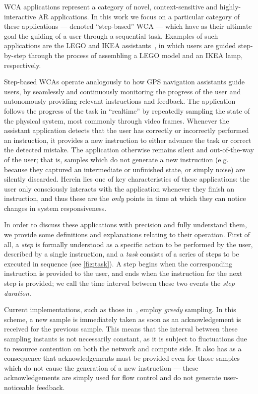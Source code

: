 \acf{WCA} applications represent a category of novel, context-sensitive and highly-interactive \ac{AR} applications.
In this work we focus on a particular category of these applications --- denoted ``step-based'' \ac{WCA} --- which have as their ultimate goal the guiding of a user through a sequential task.
Examples of such applications are the LEGO and IKEA assistants~\cite{Chen2015LEGO,Chen2018application}, in which users are guided step-by-step through the process of assembling a LEGO model and an IKEA lamp, respectively.

Step-based \acp{WCA} operate analogously to how \ac{GPS} navigation assistants guide users, by seamlessly and continuously monitoring the progress of the user and autonomously providing relevant instructions and feedback.
The application follows the progress of the task in ``realtime'' by repeatedly sampling the state of the physical system, most commonly through video frames.
Whenever the assistant application detects that the user has correctly or incorrectly performed an instruction, it provides a new instruction to either advance the task or correct the detected mistake.
The application otherwise remains silent and out-of-the-way of the user; that is, samples which do not generate a new instruction (e.g. because they captured an intermediate or unfinished state, or simply noise) are silently discarded.
Herein lies one of key characteristics of these applications: the user only consciously interacts with the application whenever they finish an instruction, and thus these are the \emph{only} points in time at which they can notice changes in system responsiveness.

In order to discuss these applications with precision and fully understand them, we provide some definitions and explanations relating to their operation.
First of all, a \emph{step} is formally understood as a specific action to be performed by the user, described by a single instruction, and a \emph{task} consists of a series of steps to be executed in sequence (see \cref{fig:task}).
A step begins when the corresponding instruction is provided to the user, and ends when the instruction for the next step is provided; we call the time interval between these two events the \emph{step duration}.

Current implementations, such as those in~\cite{Chen2015LEGO,Chen2018application}, employ \emph{greedy} sampling.
In this scheme, a new sample is immediately taken as soon as an acknowledgement is received for the previous sample.
This means that the interval between these sampling instants is not necessarily constant, as it is subject to fluctuations due to resource contention on both the network and compute side.
It also has as a consequence that acknowledgements must be provided even for those samples which do not cause the generation of a new instruction --- these acknowledgements are simply used for flow control and do not generate user-noticeable feedback.

